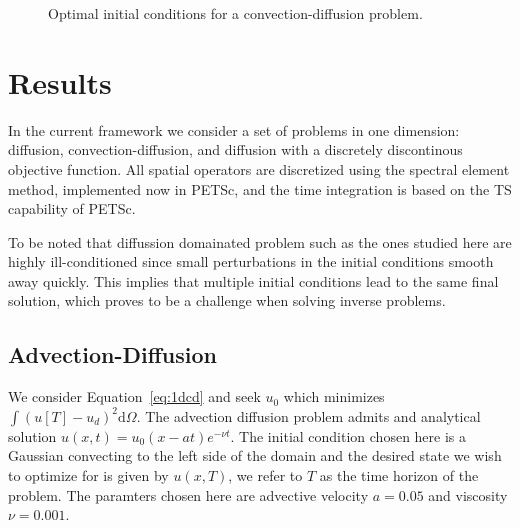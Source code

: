 \documentclass[10pt]{article}
\renewcommand{\d}{\mathrm{d}}
\begin{document}
{\begin{figure}[!h]
\centering
{}
\quad
{}
\caption{Optimal initial conditions for a convection-diffusion problem.}
\end{figure}
\section{Results}

In the current framework we consider a set of problems in one dimension: diffusion, convection-diffusion, and diffusion with a discretely discontinous objective function. All spatial operators are discretized using the spectral element method, implemented now in PETSc, and the time integration is based on the TS capability of PETSc.

To be noted that diffussion domainated problem such as the ones studied here are highly ill-conditioned since small perturbations in the initial conditions smooth away quickly. This implies that multiple initial conditions lead to the same final solution, which proves to be a challenge when solving inverse problems.


\subsection{Advection-Diffusion}
We consider Equation~\ref{eq:1dcd} and seek $u_0$ which minimizes $\int (u[T]-u_d)^2\d \Omega$. 
The advection diffusion problem admits and analytical solution $u(x,t)=u_0(x-at)e^{-\nu t}$. The initial condition chosen here is a Gaussian convecting to the left side of the domain and the desired state we wish to optimize for is given by $u(x,T)$, we refer to $T$ as the time horizon of the problem. The paramters chosen here are advective velocity $a=0.05$ and viscosity $\nu=0.001$.

}
\end{document}
